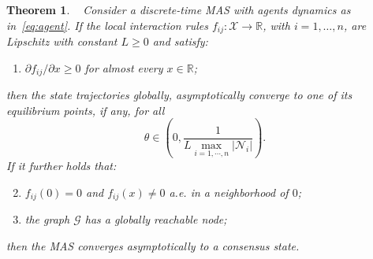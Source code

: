 \documentclass[journal,twoside,web]{ieeecolor}
\newcommand{\reply}[1]{\marginnote{\red\small\textnormal{\textbf{#1}}}}
\newcommand{\red}{\color{myred}}
\newcommand{\abs}[1]{{\left\vert #1 \right\vert}}
\newcommand{\norminf}[1]{{\left\vert\kern-0.25ex\left\vert #1\right\vert\kern-0.25ex\right\vert}_{\infty}}
\newcommand{\rea }{\mathbb{R}}
\newcommand{\Xc}{\mathcal{X}}
\newcommand{\Gc}{\mathcal{G}}
\newcommand{\Nc}{\mathcal{N}}
\newcommand{\bone}{\boldsymbol{1}}
\newcommand{\bzero}{\boldsymbol{0}}
\newtheorem{thm}{Theorem}
\begin{document}


\begin{thm}\label{th:consensus_DT}
~
Consider a discrete-time MAS with agents dynamics as in~\eqref{eq:agent}. If the local interaction rules ${f_{ij}:\Xc\rightarrow\rea}$, with ${i= 1,\ldots,n}$, are Lipschitz with constant $L\geq 0$ and satisfy:
%
\begin{enumerate}[label=$(\roman*)$]
\item $\partial f_{ij}/\partial x\geq 0$ for almost every $x\in\rea$;
\end{enumerate}
%
then the state trajectories globally, asymptotically converge  to one of its equilibrium points, if any, for all
%
\begin{equation}\label{eq:ss_mas}
    \theta\in\left(0,\frac{1}{\displaystyle L\max_{i=1,\cdots,n}\abs{\Nc_i}}\right).
\end{equation}
%
If it further holds that:
%
\begin{enumerate}[label=$(\roman*)$]
\setcounter{enumi}{1}
\item $f_{ij}(0)=0$ and $f_{ij}(x)\neq 0$ a.e. in a neighborhood of $0$;
\item the graph $\Gc$ has a globally reachable node;
\end{enumerate}
then the MAS converges asymptotically to a consensus state.
\end{thm}
\end{document}
